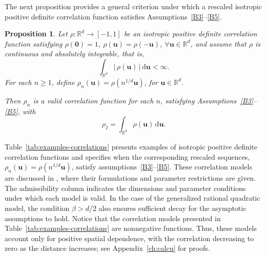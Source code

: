 \documentclass[12pt]{report} %
\newtheorem{proposition}{Proposition}
\newcommand{\bX}{\mathbf{X}}
\newcommand{\bx}{\mathbf{x}}
\newcommand{\bu}{\boldsymbol{u}}
\newcommand{\rd}{\mathrm{d}}
\begin{document}

The next proposition provides a general criterion under which a rescaled isotropic positive definite correlation function satisfies Assumptions~\ref{B3}--\ref{B5}.

\begin{proposition}
\label{prop:scaled-correlation-B3-B5}
Let $\rho:\mathbb{R}^d\to[-1,1]$ be an isotropic positive definite correlation function satisfying $\rho(\mathbf{0})=1$, $ \rho(\bu)=\rho(-\bu)$, $\forall \bu\in\mathbb{R}^d$,
and assume that $\rho$ is continuous and absolutely integrable, that is,
\[
    \int_{\mathbb{R}^d} |\,\rho(\bu)\,|\,\rd\bu < \infty.
\]
For each $n\geq 1$, define $\rho_n(\bu)=\rho(n^{1/d}\bu)$, for $\bu\in\mathbb{R}^d.$

Then $\rho_n$ is a valid correlation function for each $n$, satisfying  Assumptions~\ref{B3}--\ref{B5}, with
\[
    \rho_I=\int_{\mathbb{R}^d}\rho(\bu)\,\rd\bu.
\]
\end{proposition}


Table~\ref{tab:examples-correlations} presents examples of isotropic positive definite correlation functions and specifies when the corresponding rescaled sequences, $\rho_n(\bu) = \rho(n^{1/d}\bu)$, satisfy assumptions~\ref{B3}--\ref{B5}. These correlation models are discussed in \citet{Gneiting2013}, where their formulations and parameter restrictions are given. The admissibility column indicates the dimensions and parameter conditions under which each model is valid. In the case of the generalized rational quadratic model, the condition $\beta>d/2$ also ensures sufficient decay for the asymptotic assumptions to hold. Notice that the correlation models presented in Table~\ref{tab:examples-correlations} are nonnegative functions. Thus, these models account only for positive spatial dependence, with the correlation decreasing to zero as the distance increases; see 
Appendix~\ref{ch:calcu} for proofs.
\end{document}
